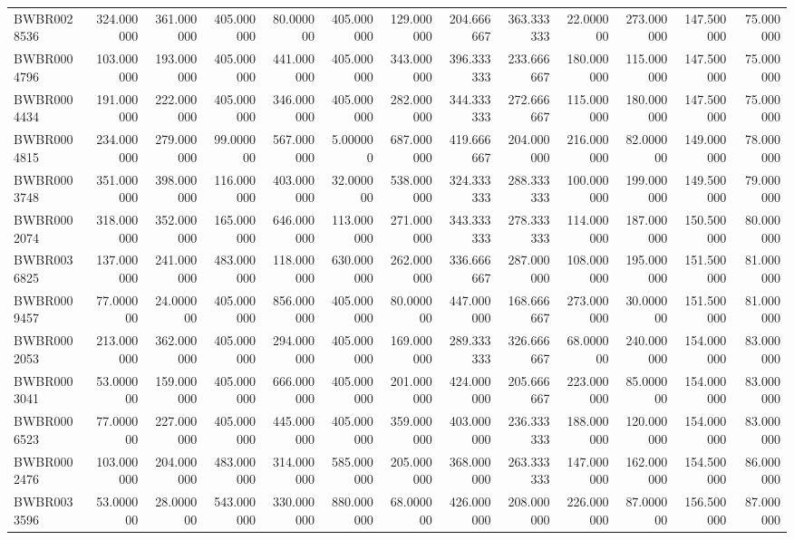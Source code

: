 \begin{longtable}{lrrrrrrrrrrrr}
BWBR0028536 & 324.000000 & 361.000000 & 405.000000 & 80.000000 & 405.000000 & 129.000000 & 204.666667 & 363.333333 & 22.000000 & 273.000000 & 147.500000 & 75.000000 \\
BWBR0004796 & 103.000000 & 193.000000 & 405.000000 & 441.000000 & 405.000000 & 343.000000 & 396.333333 & 233.666667 & 180.000000 & 115.000000 & 147.500000 & 75.000000 \\
BWBR0004434 & 191.000000 & 222.000000 & 405.000000 & 346.000000 & 405.000000 & 282.000000 & 344.333333 & 272.666667 & 115.000000 & 180.000000 & 147.500000 & 75.000000 \\
BWBR0004815 & 234.000000 & 279.000000 & 99.000000 & 567.000000 & 5.000000 & 687.000000 & 419.666667 & 204.000000 & 216.000000 & 82.000000 & 149.000000 & 78.000000 \\
BWBR0003748 & 351.000000 & 398.000000 & 116.000000 & 403.000000 & 32.000000 & 538.000000 & 324.333333 & 288.333333 & 100.000000 & 199.000000 & 149.500000 & 79.000000 \\
BWBR0002074 & 318.000000 & 352.000000 & 165.000000 & 646.000000 & 113.000000 & 271.000000 & 343.333333 & 278.333333 & 114.000000 & 187.000000 & 150.500000 & 80.000000 \\
BWBR0036825 & 137.000000 & 241.000000 & 483.000000 & 118.000000 & 630.000000 & 262.000000 & 336.666667 & 287.000000 & 108.000000 & 195.000000 & 151.500000 & 81.000000 \\
BWBR0009457 & 77.000000 & 24.000000 & 405.000000 & 856.000000 & 405.000000 & 80.000000 & 447.000000 & 168.666667 & 273.000000 & 30.000000 & 151.500000 & 81.000000 \\
BWBR0002053 & 213.000000 & 362.000000 & 405.000000 & 294.000000 & 405.000000 & 169.000000 & 289.333333 & 326.666667 & 68.000000 & 240.000000 & 154.000000 & 83.000000 \\
BWBR0003041 & 53.000000 & 159.000000 & 405.000000 & 666.000000 & 405.000000 & 201.000000 & 424.000000 & 205.666667 & 223.000000 & 85.000000 & 154.000000 & 83.000000 \\
BWBR0006523 & 77.000000 & 227.000000 & 405.000000 & 445.000000 & 405.000000 & 359.000000 & 403.000000 & 236.333333 & 188.000000 & 120.000000 & 154.000000 & 83.000000 \\
BWBR0002476 & 103.000000 & 204.000000 & 483.000000 & 314.000000 & 585.000000 & 205.000000 & 368.000000 & 263.333333 & 147.000000 & 162.000000 & 154.500000 & 86.000000 \\
BWBR0033596 & 53.000000 & 28.000000 & 543.000000 & 330.000000 & 880.000000 & 68.000000 & 426.000000 & 208.000000 & 226.000000 & 87.000000 & 156.500000 & 87.000000 \\

\end{longtable}
